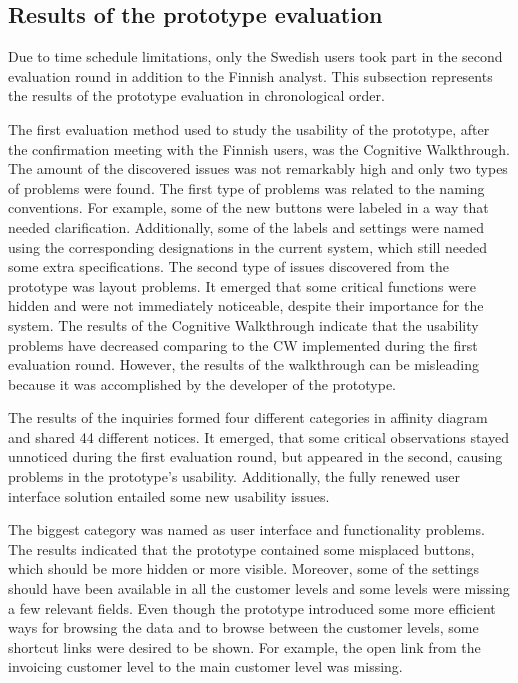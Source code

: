 \documentclass[12pt,a4paper,oneside,pdftex]{report}
\begin{document}
\subsection{Results of the prototype evaluation}

Due to time schedule limitations, only the Swedish users took part in the second evaluation round in addition to the Finnish analyst. This subsection represents the results of the prototype evaluation in chronological order. 

The first evaluation method used to study the usability of the prototype, after the confirmation meeting with the Finnish users, was the Cognitive Walkthrough. The amount of the discovered issues was not remarkably high and only two types of problems were found. The first type of problems was related to the naming conventions. For example, some of the new buttons were labeled in a way that needed clarification. Additionally, some of the labels and settings were named using the corresponding designations in the current system, which still needed some extra specifications. The second type of issues discovered from the prototype was layout problems. It emerged that some critical functions were hidden and were not immediately noticeable, despite their importance for the system. The results of the Cognitive Walkthrough indicate that the usability problems have decreased comparing to the CW implemented during the first evaluation round. However, the results of the walkthrough can be misleading because it was accomplished by the developer of the prototype.

The results of the inquiries formed four different categories in affinity diagram and shared 44 different notices. It emerged, that some critical observations stayed unnoticed during the first evaluation round, but appeared in the second, causing problems in the prototype's usability. Additionally, the fully renewed user interface solution entailed some new usability issues. 

The biggest category was named as user interface and functionality problems. The results indicated that the prototype contained some misplaced buttons, which should be more hidden or more visible. Moreover, some of the settings should have been available in all the customer levels and some levels were missing a few relevant fields. Even though the prototype introduced some more efficient ways for browsing the data and to browse between the customer levels, some shortcut links were desired to be shown. For example, the open link from the invoicing customer level to the main customer level was missing.  
\end{document}
